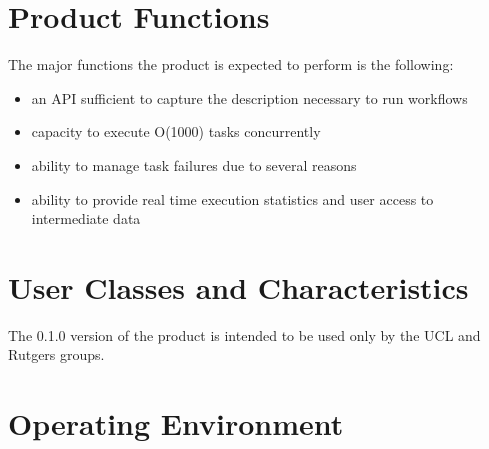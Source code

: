 \documentclass{scrreprt}
\def\myversion{0.1.0 }
\begin{document}
\section{Product Functions}

The major functions the product is expected to perform is the following:

\begin{itemize}[noitemsep]
\item an API sufficient to capture the description necessary to run workflows
\item capacity to execute O(1000) tasks concurrently
\item ability to manage task failures due to several reasons
\item ability to provide real time execution statistics and user access to intermediate data
\end{itemize}

\section{User Classes and Characteristics}

The \myversion version of the product is intended to be used only by the UCL and Rutgers groups. 

\section{Operating Environment}
\end{document}
